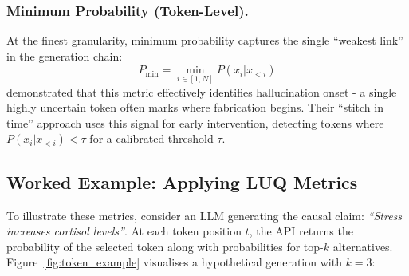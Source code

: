 \subsubsection{Minimum Probability (Token-Level).} At the finest granularity, minimum probability captures the single ``weakest link'' in the generation chain:
\begin{equation}
P_{\min} = \min_{i \in [1,N]} P(x_i | x_{<i})
\end{equation}
\citet{varshney2023stitch} demonstrated that this metric effectively identifies hallucination onset - a single highly uncertain token often marks where fabrication begins. Their ``stitch in time'' approach uses this signal for early intervention, detecting tokens where $P(x_i | x_{<i}) < \tau$ for a calibrated threshold $\tau$.

\subsection{Worked Example: Applying LUQ Metrics}

To illustrate these metrics, consider an LLM generating the causal claim: \textit{``Stress increases cortisol levels''}. At each token position $t$, the API returns the probability of the selected token along with probabilities for top-$k$ alternatives. Figure~\ref{fig:token_example} visualises a hypothetical generation with $k=3$:

